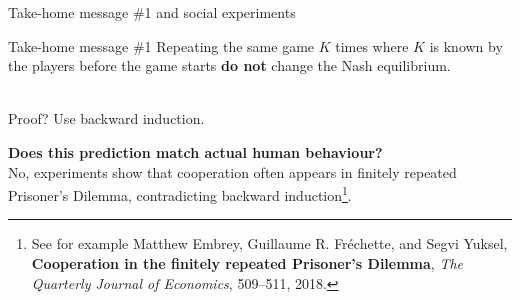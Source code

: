 \begin{frame}{Take-home message \#1 and social experiments}
    \begin{block}{Take-home message \#1}
        Repeating the same game $K$ times where $K$ is known by the players before the game starts
        \textbf{do not} change the Nash equilibrium.\\\
        
        Proof? Use backward induction.
    \end{block}

    \vspace{1cm}
    \textbf{{\color{orange}Does this prediction match actual human behaviour?}}\\
    No, experiments show that cooperation often appears in finitely repeated Prisoner's
    Dilemma, contradicting backward induction\footnote{See for example
    Matthew Embrey, Guillaume R. Fréchette, and Segvi Yuksel, \textbf{Cooperation in the
    finitely repeated Prisoner's Dilemma}, {\color{gray}\textit{The Quarterly Journal of Economics},
    509--511, 2018}.}.
\end{frame}

